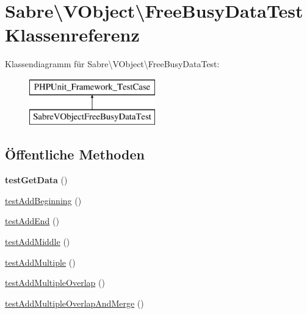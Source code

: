 \hypertarget{class_sabre_1_1_v_object_1_1_free_busy_data_test}{}\section{Sabre\textbackslash{}V\+Object\textbackslash{}Free\+Busy\+Data\+Test Klassenreferenz}
\label{class_sabre_1_1_v_object_1_1_free_busy_data_test}
Klassendiagramm für Sabre\textbackslash{}V\+Object\textbackslash{}Free\+Busy\+Data\+Test\+:\begin{figure}[H]
\begin{center}
\leavevmode
\includegraphics[height=2.000000cm]{class_sabre_1_1_v_object_1_1_free_busy_data_test}
\end{center}
\end{figure}
\subsection*{Öffentliche Methoden}
\begin{DoxyCompactItemize}
\item 
\mbox{\label{class_sabre_1_1_v_object_1_1_free_busy_data_test_ac0e1a4a9a60521942c9e1b0bb0a8b594}} 
{\bfseries test\+Get\+Data} ()
\item 
\mbox{\hyperlink{class_sabre_1_1_v_object_1_1_free_busy_data_test_aaed12825c3f5309b6767b9666a1c31c5}{test\+Add\+Beginning}} ()
\item 
\mbox{\hyperlink{class_sabre_1_1_v_object_1_1_free_busy_data_test_ab8598b8fecb7330ab37d5a05f1cdb4b2}{test\+Add\+End}} ()
\item 
\mbox{\hyperlink{class_sabre_1_1_v_object_1_1_free_busy_data_test_a2c8b8091bbbe5018a2470155b29bc55a}{test\+Add\+Middle}} ()
\item 
\mbox{\hyperlink{class_sabre_1_1_v_object_1_1_free_busy_data_test_aaf8db0c6a41323008709225342f82703}{test\+Add\+Multiple}} ()
\item 
\mbox{\hyperlink{class_sabre_1_1_v_object_1_1_free_busy_data_test_af091a467825d72cf5754f42490dcf15d}{test\+Add\+Multiple\+Overlap}} ()
\item 
\mbox{\hyperlink{class_sabre_1_1_v_object_1_1_free_busy_data_test_aaa1aa5a2bc0a760e02a60130a226ebdb}{test\+Add\+Multiple\+Overlap\+And\+Merge}} ()
\end{DoxyCompactItemize}


